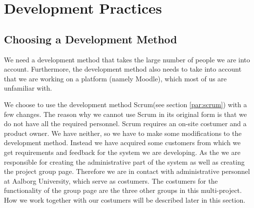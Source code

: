 \section{Development Practices} %

\subsection{Choosing a Development Method}
We need a development method that takes the large number of people we are into account.
Furthermore, the development method also needs to take into account that we are working on a platform (namely Moodle), which most of us are unfamiliar with.

We choose to use the development method Scrum(see section \ref{par:scrum}) with a few changes.
The reason why we cannot use Scrum in its original form is that we do not have all the required personnel. 
Scrum requires an on-site costumer and a product owner.
We have neither, so we have to make some modifications to the development method.
Instead we have acquired some customers from which we get requirements and feedback for the system we are developing.
As the \groupname{} we are responsible for creating the administrative part of the system as well as creating the project group page.
Therefore we are in contact with administrative personnel at Aalborg University, which serve as costumers.
The costumers for the functionality of the group page are the three other groups in this multi-project.
How we work together with our costumers will be described later in this section.

